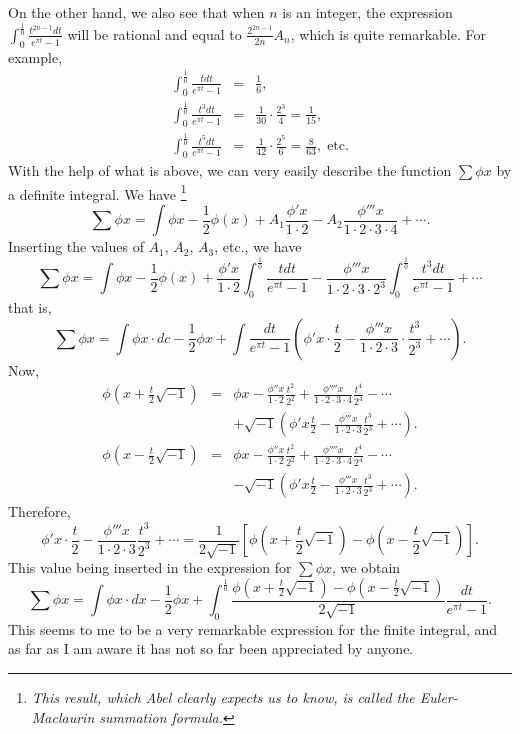 \documentclass[12pt]{article}
\begin{document}
On the other hand, we also see that when $n$ is an integer, the expression $\int_0^{\frac{1}{0}} \frac{t^{2n-1}dt}{e^{\pi t}-1}$ will be rational and equal to $\frac{2^{2n-1}}{2n} A_n$, which is quite remarkable.  For example, 
\begin{eqnarray*} \int_{0}^{\frac{1}{0}} \frac{t dt}{e^{\pi t} -1} &=& \frac{1}{6} ,\\
 \int_{0}^{\frac{1}{0}} \frac{t^3 dt}{e^{\pi t} - 1}  &=& \frac{1}{30} \cdot \frac{2^3}{4} = \frac{1}{15}, \\
 \int_{0}^{\frac{1}{0}} \frac{t^5 dt}{e^{\pi t} -1 } &=& \frac{1}{42} \cdot \frac{2^5}{6} = \frac{8}{63}, \; \mathrm{etc.} \end{eqnarray*}
With the help of what is above, we can very easily describe the function $\sum \phi x$ by a definite integral.  We have \footnote{\emph{This result, which Abel clearly expects us to know, is called the Euler-Maclaurin summation formula.}} 
\[ \sum \phi x = \int \phi x - \frac{1}{2} \phi(x) + A_1 \frac{\phi'x}{1\cdot 2} - A_2 \frac{\phi''' x}{1 \cdot 2 \cdot 3 \cdot 4} + \cdots .\]
Inserting the values of $A_1$, $A_2$, $A_3$, etc., we have
\[ \sum \phi x = \int \phi x - \frac{1}{2} \phi(x) +\frac{\phi' x}{1 \cdot 2} \int_{0}^{\frac{1}{0}} \frac{tdt}{e^{\pi t} - 1} - \frac{\phi''' x}{1 \cdot 2 \cdot 3 \cdot 2^3} \int_0^{\frac{1}{0}} \frac{t^3dt}{e^{\pi t}-1} + \cdots \]
that is,
\[ \sum \phi x = \int \phi x \cdot dc - \frac{1}{2} \phi x + \int\frac{dt}{e^{\pi t}-1} \left(\phi'x\cdot \frac{t}{2} - \frac{\phi'''x}{1\cdot 2 \cdot 3} \cdot \frac{t^3}{2^3} + \cdots \right) .\]
Now,
\begin{eqnarray*} \phi(x + \frac{t}{2} \sqrt{-1}) &=& \phi x - \frac{\phi'' x}{1 \cdot 2} \frac{t^2}{2^2} + \frac{\phi'''' x}{1 \cdot 2 \cdot 3 \cdot 4} \frac{t^4}{2^4} - \cdots \\
& & + \sqrt{-1} \left( \phi'x \frac{t}{2} - \frac{\phi''' x}{1\cdot 2 \cdot 3} \frac{t^3}{2^3} + \cdots \right). \end{eqnarray*} 
\begin{eqnarray*} \phi(x - \frac{t}{2} \sqrt{-1}) &=& \phi x - \frac{\phi'' x}{1 \cdot 2} \frac{t^2}{2^2} + \frac{\phi'''' x}{1 \cdot 2 \cdot 3 \cdot 4} \frac{t^4}{2^4} - \cdots \\
& & - \sqrt{-1} \left( \phi'x \frac{t}{2} - \frac{\phi''' x}{1\cdot 2 \cdot 3} \frac{t^3}{2^3} + \cdots \right). \end{eqnarray*}
Therefore,
\[ \phi'x \cdot \frac{t}{2} - \frac{\phi''' x}{1 \cdot 2 \cdot 3} \frac{t^3}{2^3} + \cdots = \frac{1}{2 \sqrt{-1}} \left[ \phi(x + \frac{t}{2} \sqrt{-1}) - \phi(x - \frac{t}{2} \sqrt{-1}) \right]. \]
This value being inserted in the expression for $\sum \phi x$, we obtain %
\[ \sum \phi x = \int \phi x \cdot dx - \frac{1}{2} \phi x + \int_0^{\frac{1}{0}} \frac{ \phi(x+ \frac{t}{2} \sqrt{-1}) - \phi(x - \frac{t}{2} \sqrt{-1})}{2 \sqrt{-1}} \frac{dt}{e^{\pi t} - 1} .\]
This seems to me to be a very remarkable expression for the finite integral, and as far as I am aware it has not so far been appreciated by anyone.
\end{document}
